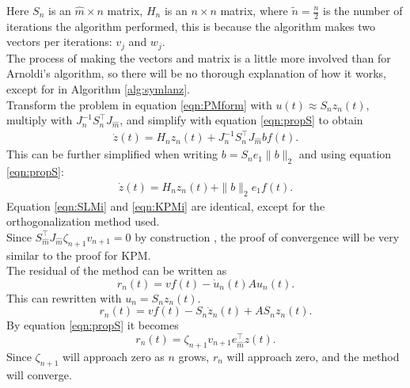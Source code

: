 Here $S_n$ is an $\hat{m} \times n $ matrix, $H_n$ is an $ n \times n $ matrix, where $ \tilde{n} = \frac{n}{2}$ is the number of iterations the algorithm performed, this is because the algorithm makes two vectors per iterations: $v_j$ and $w_j$. \\

The process of making the vectors and matrix is a little more involved than for Arnoldi's algorithm, so there will be no thorough explanation of how it works, except for in Algorithm \ref{alg:symlanz}.\\

Transform the problem in equation \eqref{eqn:PMform} with $u(t) \approx S_n z_n(t)$, multiply with $J^{-1}_n S_n^\top J_{ \hat{m} }$, and simplify with equation \eqref{eqn:propS} to obtain
\begin{equation*}
\begin{aligned}
\dot{z}(t) = H_n z_n(t) + J_n^{-1} S_n^\top J_{\hat{m}} b f(t).
\end{aligned}
\end{equation*}
This can be further simplified when writing $ b = S_n e_1 \| b \|_2 $ and using equation \eqref{eqn:propS}:
\begin{equation}
\begin{aligned}
\dot{z}(t) = H_n z_n(t) + \|b \|_2 e_1 f(t).
\end{aligned}
\label{eqn:SLMi}
\end{equation}
Equation \eqref{eqn:SLMi} and \eqref{eqn:KPMi} are identical, except for the orthogonalization method used. \\

Since $ S_{\hat{m}}^\top J_{\hat{m}} \zeta_{n+1} v_{n+1} = 0 $ by construction \cite{SLMconv}, the proof of convergence will be very similar to the proof for KPM.\\
The residual of the method can be written as
\begin{equation}
r_n(t) = v f(t) - \dot{u}_n(t) A u_n(t).
\end{equation}
This can rewritten with $u_n = S_n z_n(t)$.
\begin{equation}
r_n(t) = v f(t) -S_n \dot{z}_n(t) + A S_n z_n(t).
\end{equation}
By equation \eqref{eqn:propS} it becomes
\begin{equation}
r_n(t) =  \zeta_{n+1} v_{n+1} e_{\hat{m}}^\top z(t).
\end{equation}
Since $\zeta_{n+1}$ will approach zero as $n$ grows, $r_n$ will approach zero, and the method will converge. \\

